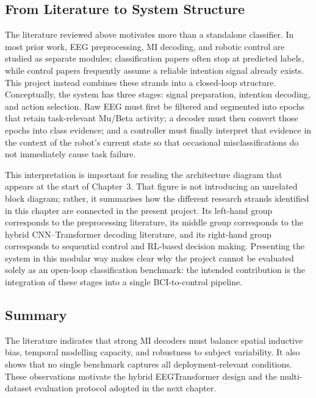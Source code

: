 \documentclass[12pt, a4paper]{article}
\begin{document}
\subsection{From Literature to System Structure}

The literature reviewed above motivates more than a standalone classifier. In most prior work, EEG preprocessing, MI decoding, and robotic control are studied as separate modules; classification papers often stop at predicted labels, while control papers frequently assume a reliable intention signal already exists. This project instead combines these strands into a closed-loop structure. Conceptually, the system has three stages: signal preparation, intention decoding, and action selection. Raw EEG must first be filtered and segmented into epochs that retain task-relevant Mu/Beta activity; a decoder must then convert those epochs into class evidence; and a controller must finally interpret that evidence in the context of the robot's current state so that occasional misclassifications do not immediately cause task failure.

This interpretation is important for reading the architecture diagram that appears at the start of Chapter~3. That figure is not introducing an unrelated block diagram; rather, it summarises how the different research strands identified in this chapter are connected in the present project. Its left-hand group corresponds to the preprocessing literature, its middle group corresponds to the hybrid CNN--Transformer decoding literature, and its right-hand group corresponds to sequential control and RL-based decision making. Presenting the system in this modular way makes clear why the project cannot be evaluated solely as an open-loop classification benchmark: the intended contribution is the integration of these stages into a single BCI-to-control pipeline.

\subsection{Summary}

The literature indicates that strong MI decoders must balance spatial inductive bias, temporal modelling capacity, and robustness to subject variability. It also shows that no single benchmark captures all deployment-relevant conditions. These observations motivate the hybrid EEGTransformer design and the multi-dataset evaluation protocol adopted in the next chapter.
\end{document}
